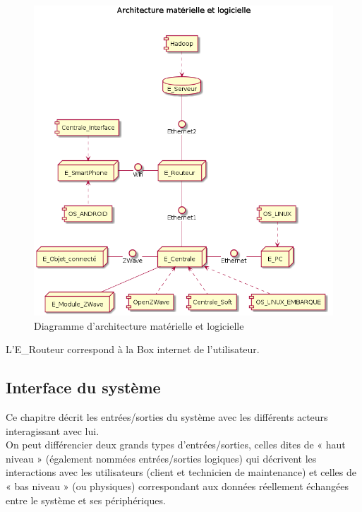\documentclass[10pt,a4paper]{report}
\begin{document}
\begin{figure}[H]
	\centering
	\includegraphics[scale=0.55]{diagArchiMatSof}
	\caption{Diagramme d'architecture matérielle et logicielle}
	\label{diagArchiMatSof}
\end{figure}

L'E\_Routeur correspond à la Box internet de l'utilisateur.

			\subsection{Interface du système}
		
Ce chapitre décrit les entrées/sorties du système avec les différents acteurs interagissant avec lui. \\

On peut différencier deux grands types d’entrées/sorties, celles dites de « haut niveau » (également nommées entrées/sorties logiques) qui décrivent les interactions avec les utilisateurs (client et technicien de maintenance) et celles de « bas niveau » (ou physiques) correspondant aux données réellement échangées entre le système et ses périphériques.
\end{document}
